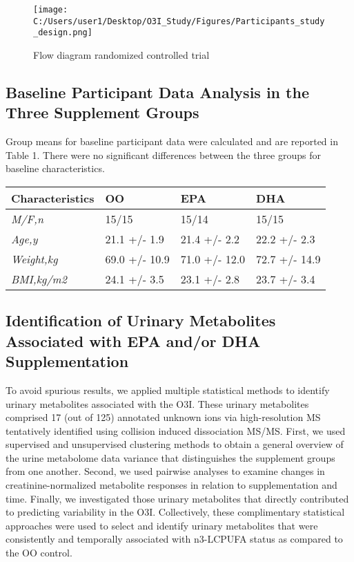 \documentclass[journal=jacsat,manuscript=article]{achemso}
\begin{document}
\begin{figure}
\centering
\texttt{[image: C:/Users/user1/Desktop/O3I\_Study/Figures/Participants\_study\_design.png]}
\caption{Flow diagram randomized controlled trial}\label{fig:fig1}
\end{figure}

\subsection{Baseline Participant Data Analysis in the Three Supplement
Groups}\label{baseline-participant-data-analysis-in-the-three-supplement-groups}

Group means for baseline participant data were calculated and are
reported in Table 1. There were no significant differences between the
three groups for baseline characteristics.

\begin{longtable}[]{@{}llll@{}}
\toprule\noalign{}
\textbf{Characteristics} & \textbf{OO} & \textbf{EPA} & \textbf{DHA} \\
\midrule\noalign{}
\endhead
\bottomrule\noalign{}
\endlastfoot
\emph{M/F,n} & 15/15 & 15/14 & 15/15 \\
\emph{Age,y} & 21.1 +/- 1.9 & 21.4 +/- 2.2 & 22.2 +/- 2.3 \\
\emph{Weight,kg} & 69.0 +/- 10.9 & 71.0 +/- 12.0 & 72.7 +/- 14.9 \\
\emph{BMI,kg/m2} & 24.1 +/- 3.5 & 23.1 +/- 2.8 & 23.7 +/- 3.4 \\
\end{longtable}

\subsection{Identification of Urinary Metabolites Associated with EPA
and/or DHA
Supplementation}\label{identification-of-urinary-metabolites-associated-with-epa-andor-dha-supplementation}

To avoid spurious results, we applied multiple statistical methods to
identify urinary metabolites associated with the O3I. These urinary
metabolites comprised 17 (out of 125) annotated unknown ions via
high-resolution MS tentatively identified using collision induced
dissociation MS/MS. First, we used supervised and unsupervised
clustering methods to obtain a general overview of the urine metabolome
data variance that distinguishes the supplement groups from one another.
Second, we used pairwise analyses to examine changes in
creatinine-normalized metabolite responses in relation to
supplementation and time. Finally, we investigated those urinary
metabolites that directly contributed to predicting variability in the
O3I. Collectively, these complimentary statistical approaches were used
to select and identify urinary metabolites that were consistently and
temporally associated with n3-LCPUFA status as compared to the OO
control.
\end{document}
